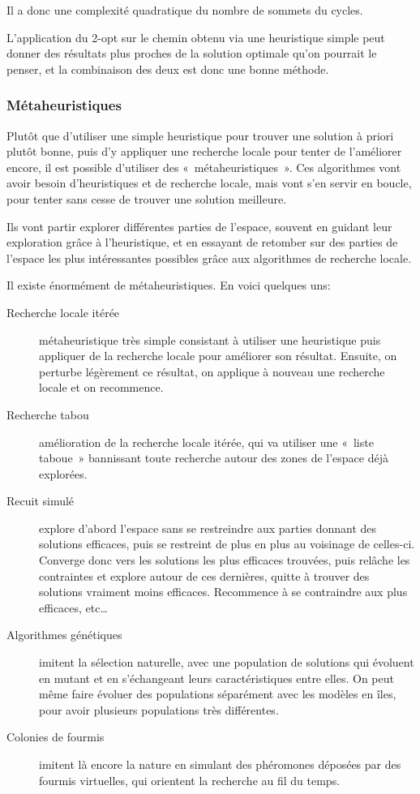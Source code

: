     Il a donc une complexité quadratique du nombre de sommets du cycles.

    L'application du 2-opt sur le chemin obtenu via une heuristique simple peut
    donner des résultats plus proches de la solution optimale qu'on pourrait le
    penser, et la combinaison des deux est donc une bonne méthode.

  \subsubsection{Métaheuristiques}

  Plutôt que d'utiliser une simple heuristique pour trouver une solution à priori plutôt
  bonne, puis d'y appliquer une recherche locale pour tenter de l'améliorer encore,
  il est possible d'utiliser des «~métaheuristiques~».
  Ces algorithmes vont avoir besoin d'heuristiques et de recherche locale, mais vont
  s'en servir en boucle, pour tenter sans cesse de trouver une solution meilleure.

  Ils vont partir explorer différentes parties de l'espace, souvent en guidant
  leur exploration grâce à l'heuristique, et en essayant de retomber sur des
  parties de l'espace les plus intéressantes possibles grâce aux algorithmes de
  recherche locale.

  Il existe énormément de métaheuristiques. En voici quelques uns:
  \begin{description}
  \item[Recherche locale itérée] métaheuristique très simple consistant à
    utiliser une heuristique puis appliquer de la recherche locale pour
    améliorer son résultat.  Ensuite, on perturbe légèrement ce résultat, on
    applique à nouveau une recherche locale et on recommence.
  \item[Recherche tabou] amélioration de la recherche locale itérée, qui va
    utiliser une «~liste taboue~» bannissant toute recherche autour des zones de
    l'espace déjà explorées.
  \item[Recuit simulé] explore d'abord l'espace sans se restreindre aux parties
    donnant des solutions efficaces, puis se restreint de plus en plus au
    voisinage de celles-ci. Converge donc vers les solutions les plus efficaces
    trouvées, puis relâche les contraintes et explore autour de ces dernières,
    quitte à trouver des solutions vraiment moins efficaces. Recommence à se
    contraindre aux plus efficaces, etc\dots
  \item[Algorithmes génétiques] imitent la sélection naturelle, avec une
    population de solutions qui évoluent en mutant et en s'échangeant leurs
    caractéristiques entre elles. On peut même faire évoluer des populations
    séparément avec les modèles en îles, pour avoir plusieurs populations très
    différentes.
  \item[Colonies de fourmis] imitent là encore la nature en simulant des
    phéromones déposées par des fourmis virtuelles, qui orientent la recherche
    au fil du temps.
  \end{description}

